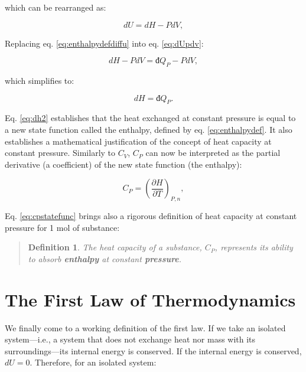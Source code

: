 \documentclass[
  9pt,
]{extbook}
\theoremstyle{definition}
\newtheorem{definition}{Definition}[chapter]
\theoremstyle{definition}
\theoremstyle{definition}
\theoremstyle{remark}
\begin{document}
which can be rearranged as:

\begin{equation}
  dU = dH -PdV,
  \label{eq:enthalpydefdiffu}
\end{equation}

Replacing eq. \eqref{eq:enthalpydefdiffu} into eq. \eqref{eq:dUpdv}:

\begin{equation}
  dH -PdV = đ Q_P - PdV,
  \label{eq:dh1}
\end{equation}

which simplifies to:

\begin{equation}
  dH = đ Q_P.
  \label{eq:dh2}
\end{equation}

Eq. \eqref{eq:dh2} establishes that the heat exchanged at constant pressure is equal to a new state function called the enthalpy, defined by eq. \eqref{eq:enthalpydef}. It also establishes a mathematical justification of the concept of heat capacity at constant pressure. Similarly to \(C_V\), \(C_P\) can now be interpreted as the partial derivative (a coefficient) of the new state function (the enthalpy):

\begin{equation}
  C_P = \left( \frac{\partial H} {\partial T} \right)_{P,n},
  \label{eq:cpstatefunc}
\end{equation}

Eq. \eqref{eq:cpstatefunc} brings also a rigorous definition of heat capacity at constant pressure for 1 mol of substance:

\begin{quote}
\begin{definition}
\protect\hypertarget{def:newdefcp}{}{\label{def:newdefcp} }\emph{The heat capacity of a substance, \(C_P\), represents its ability to absorb \textbf{enthalpy} at constant \textbf{pressure}.}
\end{definition}
\end{quote}

\hypertarget{the-first-law-of-thermodynamics}{%
\section{The First Law of Thermodynamics}\label{the-first-law-of-thermodynamics}}

We finally come to a working definition of the first law. If we take an isolated system---i.e., a system that does not exchange heat nor mass with its surroundings---its internal energy is conserved. If the internal energy is conserved, \(dU=0\). Therefore, for an isolated system:
\end{document}
